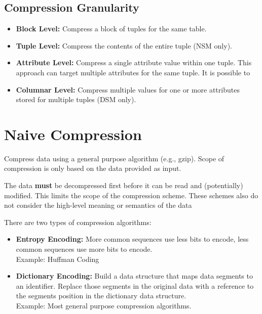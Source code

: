 \documentclass[11pt]{article}
\begin{document}
\subsection{Compression Granularity}
\begin{itemize}
    \item \textbf{Block Level:}
    Compress a block of tuples for the same table.
    
    \item \textbf{Tuple Level:}
    Compress the contents of the entire tuple (NSM only).
    
    \item \textbf{Attribute Level:}
    Compress a single attribute value within one tuple. This approach can target multiple 
attributes 
    for the same tuple. It is possible to 
    
    \item \textbf{Columnar Level:}
    Compress multiple values for one or more attributes stored for multiple tuples (DSM only).
\end{itemize}

\section{Naive Compression}
Compress data using a general purpose algorithm (e.g., gzip). Scope of compression is only 
based on the data provided as input.

The data \textbf{must} be decompressed first before it can be read and (potentially) 
modified. This limits the scope of the compression scheme. These schemes also do not consider the 
high-level meaning or semantics of the data

There are two types of compression algorithms:
\begin{itemize}
    \item \textbf{Entropy Encoding:}
    More common sequences use less bits to encode, less common 
    sequences use more bits to encode. \\
    Example: Huffman Coding
    
    \item \textbf{Dictionary Encoding:}
    Build a data structure that maps data segments to an identifier. Replace those 
    segments in the original data with a reference to the segments position in the dictionary data 
    structure. \\
    Example: Most general purpose compression algorithms.
\end{itemize}
\end{document}
